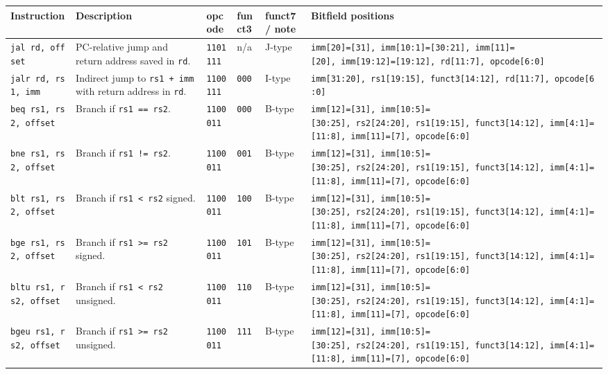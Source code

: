 \documentclass[]{article}
\begin{document}
\begin{longtable}[]{@{}llllll@{}}
\toprule
Instruction & Description & opcode & funct3 & funct7 / note & Bitfield
positions\tabularnewline
\midrule
\endhead
\texttt{jal\ rd,\ offset} & PC-relative jump and return address saved in
\texttt{rd}. & \texttt{1101111} & n/a & J-type &
\texttt{imm{[}20{]}={[}31{]},\ imm{[}10:1{]}={[}30:21{]},\ imm{[}11{]}={[}20{]},\ imm{[}19:12{]}={[}19:12{]},\ rd{[}11:7{]},\ opcode{[}6:0{]}}\tabularnewline
\texttt{jalr\ rd,\ rs1,\ imm} & Indirect jump to \texttt{rs1\ +\ imm}
with return address in \texttt{rd}. & \texttt{1100111} & \texttt{000} &
I-type &
\texttt{imm{[}31:20{]},\ rs1{[}19:15{]},\ funct3{[}14:12{]},\ rd{[}11:7{]},\ opcode{[}6:0{]}}\tabularnewline
\texttt{beq\ rs1,\ rs2,\ offset} & Branch if \texttt{rs1\ ==\ rs2}. &
\texttt{1100011} & \texttt{000} & B-type &
\texttt{imm{[}12{]}={[}31{]},\ imm{[}10:5{]}={[}30:25{]},\ rs2{[}24:20{]},\ rs1{[}19:15{]},\ funct3{[}14:12{]},\ imm{[}4:1{]}={[}11:8{]},\ imm{[}11{]}={[}7{]},\ opcode{[}6:0{]}}\tabularnewline
\texttt{bne\ rs1,\ rs2,\ offset} & Branch if \texttt{rs1\ !=\ rs2}. &
\texttt{1100011} & \texttt{001} & B-type &
\texttt{imm{[}12{]}={[}31{]},\ imm{[}10:5{]}={[}30:25{]},\ rs2{[}24:20{]},\ rs1{[}19:15{]},\ funct3{[}14:12{]},\ imm{[}4:1{]}={[}11:8{]},\ imm{[}11{]}={[}7{]},\ opcode{[}6:0{]}}\tabularnewline
\texttt{blt\ rs1,\ rs2,\ offset} & Branch if
\texttt{rs1\ \textless{}\ rs2} signed. & \texttt{1100011} & \texttt{100}
& B-type &
\texttt{imm{[}12{]}={[}31{]},\ imm{[}10:5{]}={[}30:25{]},\ rs2{[}24:20{]},\ rs1{[}19:15{]},\ funct3{[}14:12{]},\ imm{[}4:1{]}={[}11:8{]},\ imm{[}11{]}={[}7{]},\ opcode{[}6:0{]}}\tabularnewline
\texttt{bge\ rs1,\ rs2,\ offset} & Branch if
\texttt{rs1\ \textgreater{}=\ rs2} signed. & \texttt{1100011} &
\texttt{101} & B-type &
\texttt{imm{[}12{]}={[}31{]},\ imm{[}10:5{]}={[}30:25{]},\ rs2{[}24:20{]},\ rs1{[}19:15{]},\ funct3{[}14:12{]},\ imm{[}4:1{]}={[}11:8{]},\ imm{[}11{]}={[}7{]},\ opcode{[}6:0{]}}\tabularnewline
\texttt{bltu\ rs1,\ rs2,\ offset} & Branch if
\texttt{rs1\ \textless{}\ rs2} unsigned. & \texttt{1100011} &
\texttt{110} & B-type &
\texttt{imm{[}12{]}={[}31{]},\ imm{[}10:5{]}={[}30:25{]},\ rs2{[}24:20{]},\ rs1{[}19:15{]},\ funct3{[}14:12{]},\ imm{[}4:1{]}={[}11:8{]},\ imm{[}11{]}={[}7{]},\ opcode{[}6:0{]}}\tabularnewline
\texttt{bgeu\ rs1,\ rs2,\ offset} & Branch if
\texttt{rs1\ \textgreater{}=\ rs2} unsigned. & \texttt{1100011} &
\texttt{111} & B-type &
\texttt{imm{[}12{]}={[}31{]},\ imm{[}10:5{]}={[}30:25{]},\ rs2{[}24:20{]},\ rs1{[}19:15{]},\ funct3{[}14:12{]},\ imm{[}4:1{]}={[}11:8{]},\ imm{[}11{]}={[}7{]},\ opcode{[}6:0{]}}\tabularnewline
\bottomrule
\end{longtable}
\end{document}
